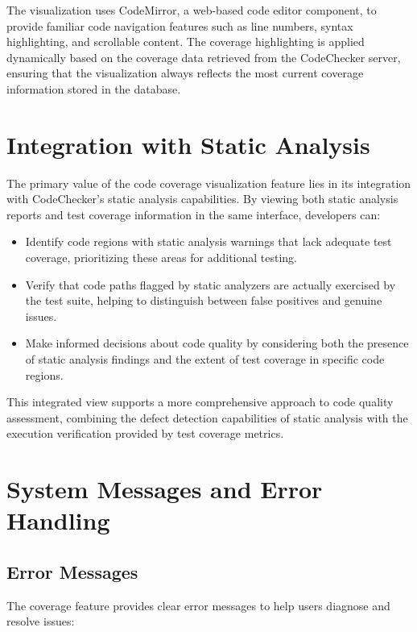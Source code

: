 The visualization uses CodeMirror, a web-based code editor component, to provide familiar code navigation features such as line numbers, syntax highlighting, and scrollable content. The coverage highlighting is applied dynamically based on the coverage data retrieved from the CodeChecker server, ensuring that the visualization always reflects the most current coverage information stored in the database.

\section{Integration with Static Analysis}

The primary value of the code coverage visualization feature lies in its integration with CodeChecker's static analysis capabilities. By viewing both static analysis reports and test coverage information in the same interface, developers can:

\begin{itemize}
    \item Identify code regions with static analysis warnings that lack adequate test coverage, prioritizing these areas for additional testing.
    \item Verify that code paths flagged by static analyzers are actually exercised by the test suite, helping to distinguish between false positives and genuine issues.
    \item Make informed decisions about code quality by considering both the presence of static analysis findings and the extent of test coverage in specific code regions.
\end{itemize}

This integrated view supports a more comprehensive approach to code quality assessment, combining the defect detection capabilities of static analysis with the execution verification provided by test coverage metrics.

\section{System Messages and Error Handling}

\subsection{Error Messages}

The coverage feature provides clear error messages to help users diagnose and resolve issues:

